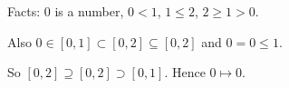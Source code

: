 \documentclass[draft]{book}
\begin{document}
Facts: $0$ is a number, $0 < 1$, $1 \leq 2$, $2 \geq 1 > 0$.

Also $0 \in [0,1] \subset [0,2] \subseteq [0,2]$ and $0 = 0 \leq 1$.

So $[0,2] \supseteq [0,2] \supset [0,1]$. Hence $0 \mapsto 0$.
\end{document}
